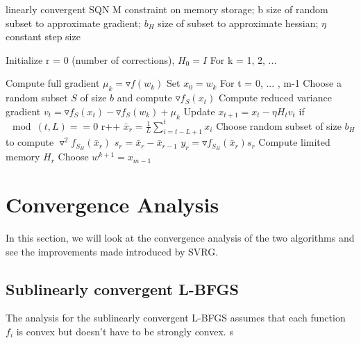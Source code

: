 \documentclass[journal,onecolumn]{IEEEtran}
\newlength\myindent
\newcommand\bindent{%
	\begingroup
	\setlength{\itemindent}{\myindent}
	\addtolength{\algorithmicindent}{\myindent}
}
\newcommand\eindent{\endgroup}
\begin{document}
\begin{algorithm}[H]
	\caption{linearly convergent SQN
		M constraint on memory storage; 
		b size of random subset to approximate gradient;
		$b_H$ size of subset to approximate hessian; $ \eta $ constant step size}
	\begin{algorithmic}
		\STATE Initialize r = 0 (number of corrections), $ H_0 = I $
		\STATE For k = 1, 2, ...
		\bindent
		\STATE Compute full gradient  $ \mu_k = \triangledown f(w_k) $
		\STATE Set $ x_0 = w_k $
		\STATE For t = 0, ... , m-1
		\STATE \hspace{2em} Choose a random subset $ S $ of size $ b $ and compute $ \triangledown f_S(x_t) $
		\STATE \hspace{2em} Compute reduced variance gradient $ v_t = \triangledown f_S(x_t)-\triangledown f_S(w_k)+\mu_k $
		\STATE \hspace{2em} Update $ x_{t+1} = x_t-\eta H_t v_t $
		\STATE \hspace{2em} if $ \mod(t, L) == 0 $
		\STATE \hspace{4em} r++
		\STATE \hspace{4em} $ \bar{x}_r = \frac{1}{L} \sum_{i=t-L+1}^{t}x_i $
		\STATE \hspace{4em} Choose random subset of size $ b_H $ to compute $ \triangledown^2 f_{S_H}(\bar{x}_r)$
		\STATE \hspace{4em} $ s_r = \bar{x}_r - \bar{x}_{r-1} $
		\STATE \hspace{4em} $ y_r = \triangledown f_{S_H}(\bar{x}_r) s_r $
		\STATE \hspace{4em} Compute limited memory $ H_r $ 	
		\STATE Choose $ w^{k+1} = x_{m-1} $
		\eindent
	\end{algorithmic}
\end{algorithm}

\section{Convergence Analysis}
In this section, we will look at the convergence analysis of the two algorithms and see the improvements made introduced by SVRG. 

\subsection{Sublinearly convergent L-BFGS}
The analysis for the sublinearly convergent L-BFGS assumes that each function $ f_i $ is convex but doesn't have to be strongly convex. s
\end{document}
